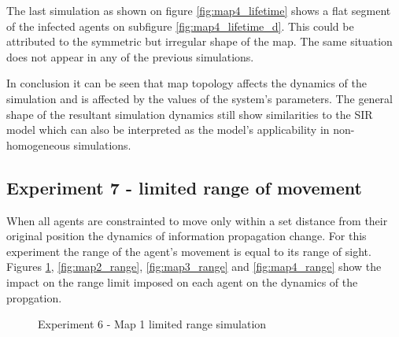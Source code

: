 The last simulation as shown on figure \ref{fig:map4_lifetime} shows a flat segment of the infected agents on subfigure \ref{fig:map4_lifetime_d}.
This could be attributed to the symmetric but irregular shape of the map.
The same situation does not appear in any of the previous simulations.

In conclusion it can be seen that map topology affects the dynamics of the simulation and is affected by the values of the system's parameters.
The general shape of the resultant simulation dynamics still show similarities to the SIR model which can also be interpreted as the model's applicability in non-homogeneous simulations.

\subsection{Experiment 7 - limited range of movement}

When all agents are constrainted to move only within a set distance from their original position the dynamics of information propagation change.
For this experiment the range of the agent's movement is equal to its range of sight.
Figures \ref{fig:map1_range}, \ref{fig:map2_range}, \ref{fig:map3_range} and \ref{fig:map4_range} show the impact on the range limit imposed on each agent on the dynamics of the propgation.

\begin{figure}[H]
    \centering

    \hspace*{\fill}
    \hspace*{\fill}

    \caption{Experiment 6 - Map 1 limited range simulation}\label{fig:map1_range}
\end{figure}

